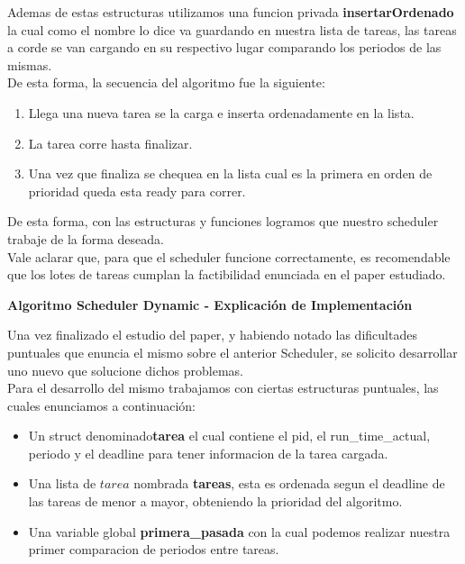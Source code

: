 Ademas de estas estructuras utilizamos una funcion privada \textbf{insertarOrdenado} la cual como el
nombre lo dice va guardando en nuestra lista de tareas, las tareas a corde se van cargando en su
respectivo lugar comparando los periodos de las mismas.\\
De esta forma, la secuencia del algoritmo fue la siguiente:

\begin{enumerate}
 \item Llega una nueva tarea se la carga e inserta ordenadamente en la lista.
 \item La tarea corre hasta finalizar.
 \item Una vez que finaliza se chequea en la lista cual es la primera en orden de prioridad queda
 esta ready para correr.
 \end{enumerate}

De esta forma, con las estructuras y funciones logramos que nuestro scheduler trabaje de la forma
deseada.\\

Vale aclarar que, para que el scheduler funcione correctamente, es recomendable que los lotes de tareas
cumplan la factibilidad enunciada en el paper estudiado.\\


\hspace{3pt}
\begin{center}
\textbf{Algoritmo Scheduler Dynamic - Explicación de Implementación}\\ 
\end{center}

Una vez finalizado el estudio del paper, y habiendo notado las dificultades puntuales que enuncia el mismo
sobre el anterior Scheduler, se solicito desarrollar uno nuevo que solucione dichos problemas.\\

Para el desarrollo del mismo trabajamos con ciertas estructuras puntuales, las cuales enunciamos
a continuación:\\

\begin{itemize}
 \item Un struct denominado\textbf{tarea}  el cual contiene el pid, el run\_time\_actual, periodo y el deadline para tener
 informacion de la tarea cargada.
 \item Una lista de $tarea$ nombrada \textbf{tareas}, esta es ordenada segun el deadline de las tareas
 de menor a mayor, obteniendo la prioridad del algoritmo.
  \item Una variable global \textbf{primera\_pasada} con la cual podemos realizar nuestra primer 
 comparacion de periodos entre tareas.
\end{itemize}

